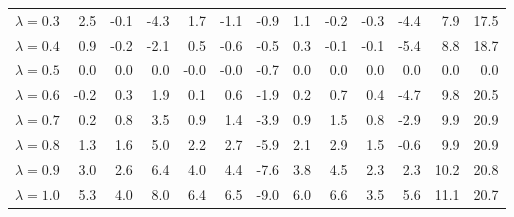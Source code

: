 \begin{table}[H]
{{\begin{tabular}{lrrrrrrrrrrrr}
\rule{0pt}{4ex}$\lambda=0.3$ & 2.5 & -0.1 & -4.3 & 1.7 & -1.1 & -0.9 & 1.1 & -0.2 & -0.3 & -4.4 & 7.9 & 17.5\\
$\lambda=0.4$ & 0.9 & -0.2 & -2.1 & 0.5 & -0.6 & -0.5 & 0.3 & -0.1 & -0.1 & -5.4 & 8.8 & 18.7\\
$\lambda=0.5$ & 0.0 & 0.0 & 0.0 & -0.0 & -0.0 & -0.7 & 0.0 & 0.0 & 0.0 & 0.0 & 0.0 & 0.0\\
$\lambda=0.6$ & -0.2 & 0.3 & 1.9 & 0.1 & 0.6 & -1.9 & 0.2 & 0.7 & 0.4 & -4.7 & 9.8 & 20.5\\
$\lambda=0.7$ & 0.2 & 0.8 & 3.5 & 0.9 & 1.4 & -3.9 & 0.9 & 1.5 & 0.8 & -2.9 & 9.9 & 20.9\\

\rule{0pt}{4ex}$\lambda=0.8$ & 1.3 & 1.6 & 5.0 & 2.2 & 2.7 & -5.9 & 2.1 & 2.9 & 1.5 & -0.6 & 9.9 & 20.9\\
$\lambda=0.9$ & 3.0 & 2.6 & 6.4 & 4.0 & 4.4 & -7.6 & 3.8 & 4.5 & 2.3 & 2.3 & 10.2 & 20.8\\
$\lambda=1.0$ & 5.3 & 4.0 & 8.0 & 6.4 & 6.5 & -9.0 & 6.0 & 6.6 & 3.5 & 5.6 & 11.1 & 20.7\\
\bottomrule
\end{tabular}
} %

} %
\label{tab:syst:lambda_ups1s}
\end{table}

